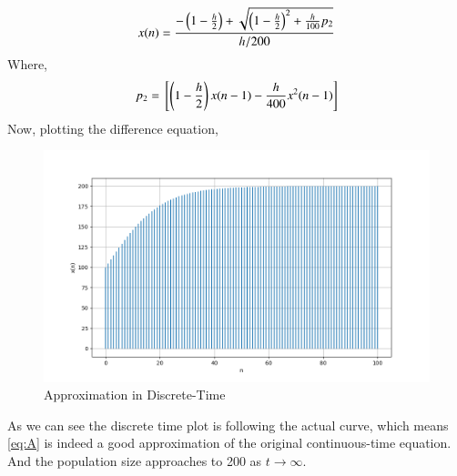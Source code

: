 \documentclass[journal,12pt,twocolumn]{IEEEtran}
\theoremstyle{remark}
\begin{document}
\begin{align}
    x(n)=\frac{-\left(1-\frac{h}{2}\right)+\sqrt{\left(1-\frac{h}{2}\right)^2+\frac{h}{100}p_2}}{h/200} \label{eq:A}
\end{align}
Where,
\begin{align}
    p_2={}\left[\left(1-\frac{h}{2}\right)x(n-1)-\frac{h}{400}x^2(n-1)\right]
\end{align}
Now, plotting the difference equation,
\begin{figure}[h]
    \centering
    \includegraphics[width=1.1\columnwidth]{figs/DT.png}
    \caption{Approximation in Discrete-Time}
\end{figure}
\newline
As we can see the discrete time plot is following the actual curve, which means \eqref{eq:A} is indeed a good approximation of the original continuous-time equation.
\newline
And the population size approaches to 200 as $t \rightarrow \infty$.
\end{document}
